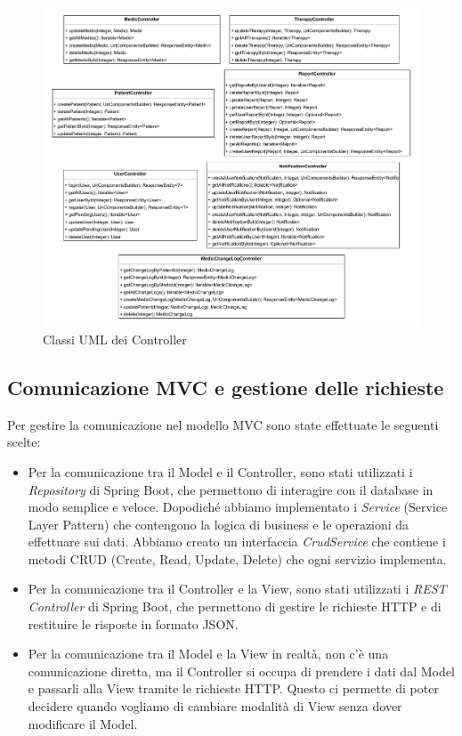 \documentclass[a4paper]{article}
\begin{document}
\begin{figure}[H]
  \begin{center}
    \includegraphics[width=1\textwidth]{controller.pdf}
  \end{center}
  \caption{Classi UML dei Controller} 
  \label{fig:controller}
\end{figure}
\noindent

\subsection{Comunicazione MVC e gestione delle richieste}

Per gestire la comunicazione nel modello MVC sono state effettuate le seguenti scelte:
\begin{itemize}
  \item Per la comunicazione tra il Model e il Controller, sono stati utilizzati i \textit{Repository} di Spring Boot, 
  che permettono di interagire con il database in modo semplice e veloce. Dopodiché abbiamo implementato
  i \textit{Service} (Service Layer Pattern) che contengono la logica di business e le operazioni da effettuare sui dati. Abbiamo creato
  un interfaccia \textit{CrudService} che contiene i metodi CRUD (Create, Read, Update, Delete) che ogni servizio implementa.
  \item Per la comunicazione tra il Controller e la View, sono stati utilizzati i \textit{REST Controller} di Spring Boot, 
  che permettono di gestire le richieste HTTP e di restituire le risposte in formato JSON.
  \item Per la comunicazione tra il Model e la View in realtà, non c'è una comunicazione diretta, ma il Controller
  si occupa di prendere i dati dal Model e passarli alla View tramite le richieste HTTP. Questo ci permette 
  di poter decidere quando vogliamo di cambiare modalità di View senza dover modificare il Model.
\end{itemize}
\end{document}
